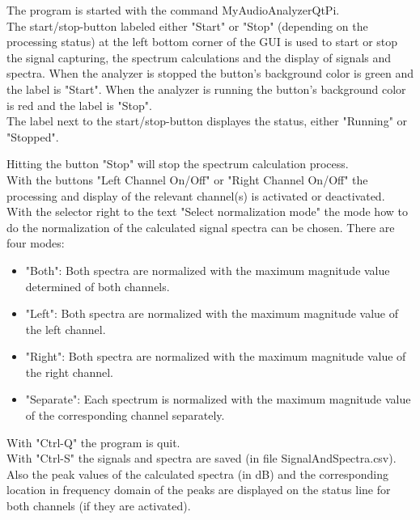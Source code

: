 \documentclass[11pt, oneside]{scrartcl}   	%
\begin{document}
The program is started with the command MyAudioAnalyzerQtPi.\\

The start/stop-button labeled either "Start" or "Stop" (depending on the processing status) at the left bottom corner of the GUI is used to start or stop the signal capturing, the spectrum calculations and the display of signals and spectra.
When the analyzer is stopped the button's background color is green and the label is "Start". When the analyzer is running the button's background color is red and the label is "Stop".\\

The label next to the start/stop-button displayes the status, either "Running" or "Stopped".
 
Hitting the button "Stop" will stop the spectrum calculation process.\\

With the buttons "Left Channel On/Off" or "Right Channel On/Off" the processing and display of the relevant channel(s) is activated or deactivated.\\

With the selector right to the text "Select normalization mode" the mode how to do the normalization of the
calculated signal spectra can be chosen. There are four modes:
\begin{itemize}
	\item "Both": Both spectra are normalized with the maximum magnitude value determined of both channels.
	\item "Left": Both spectra are normalized with the maximum magnitude value of the left channel.
	\item "Right": Both spectra are normalized with the maximum magnitude value of the right channel.
	\item "Separate": Each spectrum is normalized with the maximum magnitude value of the corresponding channel separately.
\end{itemize}

With "Ctrl-Q" the program is quit. \\

With "Ctrl-S" the signals and spectra are saved (in file SignalAndSpectra.csv).\\

Also the peak values of the calculated spectra (in dB) and the corresponding location in frequency domain of the peaks are displayed on the status line for both channels (if they are activated).\\
\end{document}
